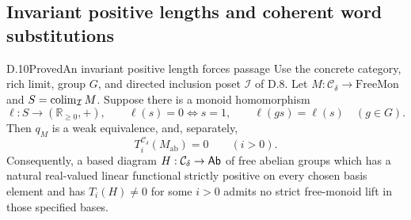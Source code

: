 \subsection{Invariant positive lengths and coherent word substitutions}

\begin{claim}{D.10}{Proved}{An invariant positive length forces passage}
\label{D:invariant-positive-length}
Use the concrete category, rich limit, group $G$, and directed
inclusion poset $\mathcal I$ of D.8. Let
$M:\mathcal C_\delta\to\mathrm{FreeMon}$ and
$S=\operatorname*{colim}_{\mathcal I}M$. Suppose there is a monoid homomorphism
\[
 \ell:S\longrightarrow(\mathbb R_{\geq0},+),\qquad
 \ell(s)=0\Longleftrightarrow s=1,\qquad
 \ell(gs)=\ell(s)\quad(g\in G).
 \tag{D.10.1}
\]
Then $q_M$ is a weak equivalence, and, separately,
\[
                   T_i^{\mathcal C_\delta}(M_{\mathrm{ab}})=0
                   \qquad(i>0).
 \tag{D.10.2}
\]
Consequently, a based diagram $H:\mathcal C_\delta\to\mathsf{Ab}$ of
free abelian groups which has a natural real-valued linear
functional strictly positive on every chosen basis element and
has $T_i(H)\ne0$ for some $i>0$ admits no strict free-monoid lift
in those specified bases.
\end{claim}
